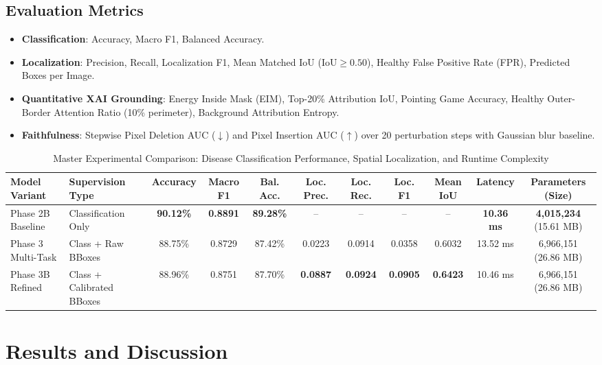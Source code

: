 \documentclass[conference]{IEEEtran}
\begin{document}
\subsection{Evaluation Metrics}
\begin{itemize}
    \item \textbf{Classification}: Accuracy, Macro F1, Balanced Accuracy.
    \item \textbf{Localization}: Precision, Recall, Localization F1, Mean Matched IoU ($\text{IoU} \ge 0.50$), Healthy False Positive Rate (FPR), Predicted Boxes per Image.
    \item \textbf{Quantitative XAI Grounding}: Energy Inside Mask (EIM), Top-20\% Attribution IoU, Pointing Game Accuracy, Healthy Outer-Border Attention Ratio (10\% perimeter), Background Attribution Entropy.
    \item \textbf{Faithfulness}: Stepwise Pixel Deletion AUC ($\downarrow$) and Pixel Insertion AUC ($\uparrow$) over 20 perturbation steps with Gaussian blur baseline.
\end{itemize}

\begin{table}[t]
\centering
\caption{Master Experimental Comparison: Disease Classification Performance, Spatial Localization, and Runtime Complexity}
\label{tab:main_model_comparison}
\footnotesize
\setlength{\tabcolsep}{6.0pt}
\begin{tabular}{llccccccccc}
\toprule
\textbf{Model Variant} & \textbf{Supervision Type} & \textbf{Accuracy} & \textbf{Macro F1} & \textbf{Bal. Acc.} & \textbf{Loc. Prec.} & \textbf{Loc. Rec.} & \textbf{Loc. F1} & \textbf{Mean IoU} & \textbf{Latency} & \textbf{Parameters (Size)} \\
\midrule
Phase 2B Baseline & Classification Only & \textbf{90.12\%} & \textbf{0.8891} & \textbf{89.28\%} & -- & -- & -- & -- & \textbf{10.36 ms} & \textbf{4,015,234} (15.61 MB) \\
Phase 3 Multi-Task & Class + Raw BBoxes & 88.75\% & 0.8729 & 87.42\% & 0.0223 & 0.0914 & 0.0358 & 0.6032 & 13.52 ms & 6,966,151 (26.86 MB) \\
Phase 3B Refined & Class + Calibrated BBoxes & 88.96\% & 0.8751 & 87.70\% & \textbf{0.0887} & \textbf{0.0924} & \textbf{0.0905} & \textbf{0.6423} & 10.46 ms & 6,966,151 (26.86 MB) \\
\bottomrule
\end{tabular}
\end{table}

\section{Results and Discussion}
\label{sec:results}
\end{document}
